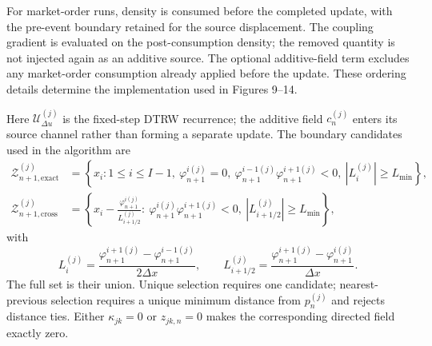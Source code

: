 For market-order runs, density is consumed before the completed update, with the pre-event boundary retained for the source displacement. The coupling gradient is evaluated on the post-consumption density; the removed quantity is not injected again as an additive source. The optional additive-field term excludes any market-order consumption already applied before the update. These ordering details determine the implementation used in Figures 9--14.

Here $\mathcal U_{\Delta u}^{(j)}$ is the fixed-step DTRW recurrence; the
additive field $c_n^{(j)}$ enters its source channel rather than forming a
separate update.  The boundary candidates used in the algorithm are
\begin{align}
\mathcal Z_{n+1,\mathrm{exact}}^{(j)}
&=\left\{x_i:1\leq i\leq I-1,\ \varphi_{n+1}^{i(j)}=0,\
\varphi_{n+1}^{i-1(j)}\varphi_{n+1}^{i+1(j)}<0,\
|L_i^{(j)}|\geq L_{\min}\right\},\\
\mathcal Z_{n+1,\mathrm{cross}}^{(j)}
&=\left\{x_i-\frac{\varphi_{n+1}^{i(j)}}{L_{i+1/2}^{(j)}}:\
\varphi_{n+1}^{i(j)}\varphi_{n+1}^{i+1(j)}<0,\
|L_{i+1/2}^{(j)}|\geq L_{\min}\right\},
\end{align}
with
\begin{equation}
L_i^{(j)}=\frac{\varphi_{n+1}^{i+1(j)}-\varphi_{n+1}^{i-1(j)}}{2\Delta x},
\qquad
L_{i+1/2}^{(j)}=\frac{\varphi_{n+1}^{i+1(j)}-\varphi_{n+1}^{i(j)}}{\Delta x}.
\end{equation}
The full set is their union.  Unique selection requires one candidate;
nearest-previous selection requires a unique minimum distance from $p_n^{(j)}$
and rejects distance ties.  Either $\kappa_{jk}=0$ or $z_{jk,n}=0$ makes the
corresponding directed field exactly zero.

